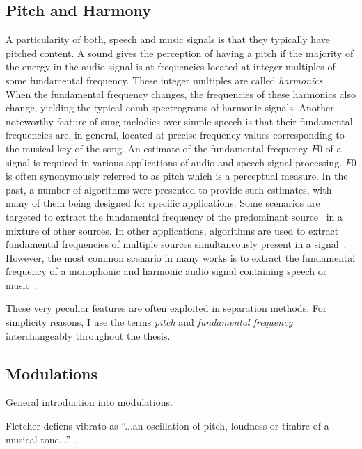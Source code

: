 \subsection{Pitch and Harmony}

A particularity of both, speech and music signals is that they typically have pitched content.
A sound gives the perception of having a pitch if the majority of the energy in the audio signal is at frequencies located at integer multiples of some fundamental frequency.
These integer multiples are called \textit{harmonics}~\cite{schenker54}.
When the fundamental frequency changes, the frequencies of these harmonics also change, yielding the typical comb spectrograms of harmonic signals.
Another noteworthy feature of sung melodies over simple speech is that their fundamental frequencies are, in general, located at precise frequency values corresponding to the musical key of the song.
An estimate of the fundamental frequency $F0$ of a signal is required in various applications of audio and speech signal processing.
$F0$ is often synonymously referred to as pitch which is a perceptual measure. In the past, a number of algorithms were presented to provide such estimates, with many of them being designed for specific applications.
Some scenarios are targeted to extract the fundamental frequency of the predominant source~\cite{salamon12} in a mixture of other sources.
In other applications, algorithms are used to extract fundamental frequencies of multiple sources simultaneously present in a signal~\cite{klapuri03}.
However, the most common scenario in many works is to extract the fundamental frequency of a monophonic and harmonic audio signal containing speech or music~\cite{talkin95, boersma02, decheveigne02, resch07, camacho07, tidhar10, christensen07}.

These very peculiar features are often exploited in separation methods.
For simplicity reasons, I use the terms \textit{pitch} and \textit{fundamental frequency} interchangeably throughout the thesis.

\subsection{Modulations}

General introduction into modulations.
\cite{abe98}

Fletcher defiens vibrato as ``...an oscillation of pitch, loudness or timbre of a musical tone...''~\cite{fletcher01}.

